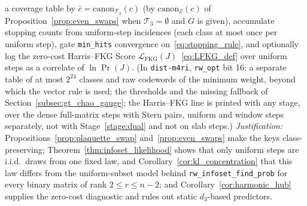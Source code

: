 \documentclass[12pt]{article}
\theoremstyle{definition}
\newcommand{\Tc}{\mathcal{T}_3}
\newcommand{\LFKG}{\mathcal{L}_{\mathrm{FKG}}}
\newcommand{\ttt}[1]{\texttt{#1}}
\begin{document}
\begin{enumerate}[label=\textbf{Stage~\arabic*.}, ref=\arabic*, wide=0pt]
    a coverage table by $\bar{c} = \mathrm{canon}_{\Tc}(c)$ (by $\mathrm{canon}_{\mathcal{E}}(c)$ of
    Proposition~\ref{prop:even_swaps} when $\Tc = \emptyset$ and $G$ is given), accumulate stopping counts from
    uniform-step incidences (each class at most once per uniform step), gate \ttt{min\_hits} convergence
    on~\eqref{eq:stopping_rule}, and
    optionally log the zero-cost Harris--FKG Score $\LFKG(J)$~\eqref{eq:LFKG_def} over uniform steps as a correlate
    of $\ln \Pr(J)$. (In \ttt{dist-m4ri}, \ttt{rw\_opt} bit 16: a separate table of at most $2^{24}$ classes and raw
    codewords of the minimum weight, beyond which the vector rule is used; the thresholds and the missing fallback of
    Section~\ref{subsec:gt_chao_gauge}; the Harris--FKG line is printed with any stage, over the dense full-matrix
    steps with Stern pairs, uniform and window steps separately, not with Stage~\ref{stage:dual} and not on slab
    steps.) \emph{Justification:} Propositions~\ref{prop:plaquette_swap} and~\ref{prop:even_swaps} make the
    keys class-preserving; Theorem~\ref{thm:infoset_likelihood} shows that only uniform steps are i.i.d.\ draws from
    one fixed law, and Corollary~\ref{cor:kl_concentration} that this law differs from the uniform-subset model behind
    \ttt{rw\_infoset\_find\_prob} for every binary matrix of rank $2 \le r \le n - 2$; and
    Corollary~\ref{cor:harmonic_hub} supplies the zero-cost diagnostic and rules out static $d_3$-based predictors.
\end{enumerate}
\end{document}
